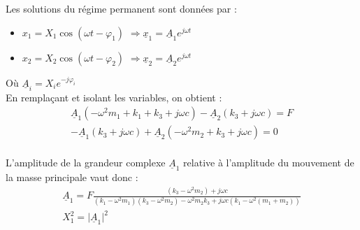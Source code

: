 \documentclass[../main.tex]{subfiles}
\begin{document}
Les solutions du régime permanent sont données par : \begin{itemize}
    \item $x_1 = X_1 \cos(\omega t-\varphi_1)$ $\Rightarrow \underline{x}_1 = \underline{A}_1 e^{j\omega t}$\\
    \item $x_2 = X_2 \cos(\omega t-\varphi_2)$ $\Rightarrow \underline{x}_2 = \underline{A}_2 e^{j\omega t}$\\
\end{itemize}

Où $\underline{A}_i = X_i e^{-j\varphi_i}$\\

En remplaçant et isolant les variables, on obtient : \begin{equation}
\begin{gathered}
    \underline{A}_1(-\omega^2m_1 + k_1 + k_3 + j\omega c) - \underline{A}_2(k_3 + j\omega c)=F\\
    -\underline{A}_1(k_3+j\omega c) + \underline{A}_2(-\omega^2m_2 + k_3 + j\omega c) = 0\\
    \end{gathered}
\end{equation}

L'amplitude de la grandeur complexe $\underline{A}_1$ relative à l'amplitude du mouvement de la masse principale vaut donc : \begin{equation}
    \begin{gathered}
        \underline{A}_1 = F \frac{(k_3-\omega^2m_2)+j\omega c}{(k_1-\omega^2m_1)(k_3-\omega^2m_2) - \omega^2 m_2k_3 + j\omega c(k_1 - \omega^2(m_1+m_2))}\\
        X_1^2 = \lvert \underline{A}_1\rvert^2\\
    \end{gathered}
\end{equation}
\end{document}
